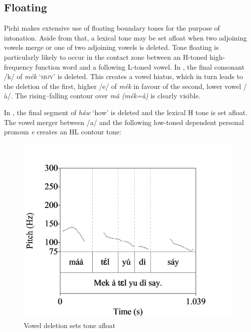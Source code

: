 \subsection{Floating}\label{sec:3.2.2}

Pichi makes extensive use of floating boundary tones for the purpose of intonation. Aside from that, a lexical tone may be set afloat when two adjoining vowels merge or one of two adjoining vowels is deleted. Tone floating is particularly likely to occur in the contact zone between an H-toned high-frequency function word and a following L-toned vowel. In , the final consonant /k/ of \textit{mék} ‘\textsc{sbjv}’ is deleted\index{}. This creates a vowel hiatus, which in turn leads to the deletion of the first, higher /e/ of \textit{mék} in favour of the second, lower vowel /à/. The rising–falling contour over \textit{mâ (mék=à)} is clearly visible. 


In , the final segment of \textit{háw} ‘how’ is deleted and the lexical H tone is set afloat. The vowel merger between /a/ and the following low-toned dependent personal pronoun \textit{e} creates an HL contour tone: 


\begin{figure}
\caption{Vowel deletion sets tone afloat}
\label{fig:key:3.14}
\includegraphics[height=.3\textheight]{figures/yakpomod-img16.png}
\end{figure}


